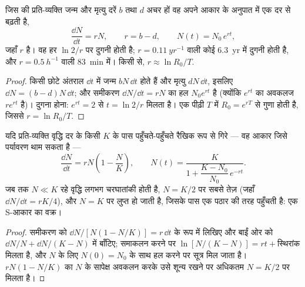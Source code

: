\begin{theorem}[चरघातांकी वृद्धि]\label{thm:b1:populations:exponential}
जिस  की प्रति-व्यक्ति जन्म और मृत्यु दरें $b$ तथा $d$ अचर हों वह
अपने आकार के अनुपात में एक दर से बढ़ती है,
\[
\frac{\dd N}{\dd t} = rN, \qquad r = b - d, \qquad N(t) = N_0\,e^{rt},
\]
जहाँ $r$ \emph{} है। वह हर
$\ln 2/r$ पर दुगनी होती है; $r = \qty{0.11}{yr^{-1}}$ वाली कोई 
\qty{6.3}{yr} में दुगनी होती है, और $r = \qty{0.5}{h^{-1}}$ वाली
\qty{83}{min} में। किसी  से, $r \approx \ln R_0 / T$.
\end{theorem}
\begin{proof}
किसी छोटे अंतराल $\dd t$ में जन्म $bN\,\dd t$ होते हैं और मृत्यु
$dN\,\dd t$, इसलिए $\dd N = (b - d)N\,\dd t$; और समीकरण
$\dd N/\dd t = rN$ का हल $N_0 e^{rt}$ है (क्योंकि
$e^{rt}$ का अवकलज $re^{rt}$ है)। दुगना होना: $e^{rt} = 2$ से $t = \ln 2/r$
मिलता है। एक पीढ़ी $T$ में  $R_0 = e^{rT}$ से गुणा होती है,
जिससे $r = \ln R_0/T$.
\end{proof}

\begin{theorem}[संभार-तांत्रिक वृद्धि]\label{thm:b1:populations:logistic}
यदि प्रति-व्यक्ति वृद्धि दर  के किसी \emph{} $K$ के पास
पहुँचते-पहुँचते रैखिक रूप से गिरे --- वह आकार जिसे पर्यावरण थाम सकता है
---
\[
\frac{\dd N}{\dd t} = rN\left(1 - \frac{N}{K}\right), \qquad
N(t) = \frac{K}{1 + \dfrac{K - N_0}{N_0}\,e^{-rt}} .
\]
जब तक $N \ll K$ रहे वृद्धि लगभग चरघातांकी होती है, $N = K/2$ पर सबसे
तेज़ (जहाँ $\dd N/\dd t = rK/4$), और $N = K$ पर लुप्त हो जाती है, जिसके
पास  एक पठार की तरह पहुँचती है: एक S-आकार का वक्र।
\end{theorem}
\begin{proof}
समीकरण को $\dd N/[N(1 - N/K)] = r\,\dd t$ के रूप में लिखिए और बाईं ओर को
$\dd N/N + \dd N/(K - N)$ में बाँटिए; समाकलन करने पर
$\ln[N/(K - N)] = rt + \text{स्थिरांक}$ मिलता है, और $N$ के लिए $N(0) =
N_0$ के साथ हल करने पर सूत्र मिल जाता है। $rN(1 - N/K)$ का
$N$ के सापेक्ष अवकलन करके उसे शून्य रखने पर अधिकतम $N = K/2$ पर मिलता है।
\end{proof}

